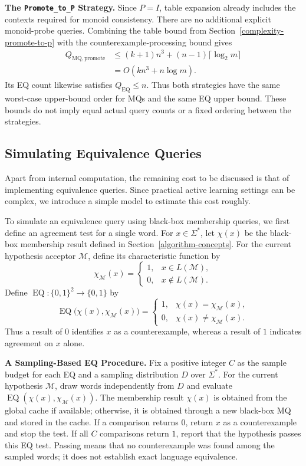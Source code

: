 \documentclass{ieice-tecrep}
\begin{document}
\textbf{The \texttt{Promote\_to\_P} Strategy.}
Since \(P=I\), table expansion already includes the contexts required
for monoid consistency. There are no additional explicit monoid-probe
queries. Combining the table bound from
Section~\ref{complexity-promote-to-p} with the counterexample-processing
bound gives
\[
\begin{aligned}
Q_{\mathrm{MQ},\mathrm{promote}}
&\le(k+1)n^3+(n-1)\lceil\log_2m\rceil\\
&=O(kn^3+n\log m).
\end{aligned}
\]
Its EQ count likewise satisfies \(Q_{\mathrm{EQ}}\le n\).
Thus both strategies have the same worst-case upper-bound order for
MQs and the same EQ upper bound. These bounds do not imply equal
actual query counts or a fixed ordering between the strategies.

\subsection{Simulating Equivalence Queries}\label{complexity-simulated-eq}

Apart from internal computation, the remaining cost to be discussed
is that of implementing equivalence queries. Since practical active
learning settings can be complex, we introduce a simple model to
estimate this cost roughly.

To simulate an equivalence query using black-box membership queries,
we first define an agreement test for a single word.
For \(x\in\Sigma^*\), let \(\chi(x)\) be the black-box membership
result defined in Section~\ref{algorithm-concepts}.
For the current hypothesis acceptor \(\mathcal{M}\), define its
characteristic function by
\[
\chi_{\mathcal{M}}(x)=
\begin{cases}
1, & x\in L(\mathcal{M}),\\
0, & x\notin L(\mathcal{M}).
\end{cases}
\]
Define \(\operatorname{EQ}:\{0,1\}^2\to\{0,1\}\) by
\[
\operatorname{EQ}\bigl(\chi(x),\chi_{\mathcal{M}}(x)\bigr)=
\begin{cases}
1, & \chi(x)=\chi_{\mathcal{M}}(x),\\
0, & \chi(x)\ne\chi_{\mathcal{M}}(x).
\end{cases}
\]
Thus a result of \(0\) identifies \(x\) as a counterexample, whereas
a result of \(1\) indicates agreement on \(x\) alone.

\textbf{A Sampling-Based EQ Procedure.}
Fix a positive integer \(C\) as the sample budget for each EQ and a
sampling distribution \(D\) over \(\Sigma^*\). For the current
hypothesis \(\mathcal{M}\), draw words independently from \(D\) and
evaluate \(\operatorname{EQ}(\chi(x),\chi_{\mathcal{M}}(x))\).
The membership result \(\chi(x)\) is obtained from the global cache
if available; otherwise, it is obtained through a new black-box MQ
and stored in the cache. If a comparison returns \(0\), return
\(x\) as a counterexample and stop the test. If all \(C\) comparisons
return \(1\), report that the hypothesis passes this EQ test.
Passing means that no counterexample was found among the sampled
words; it does not establish exact language equivalence.
\end{document}
